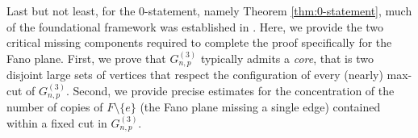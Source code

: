\documentclass[11pt,a4paper,oneside,reqno]{amsart}
\newcommand{\Gnp}{G_{n, p}^{(3)}}
\newcommand{\1}{\mathbbm{1}} %
\begin{document}
Last but not least, for the 0-statement, namely Theorem \ref{thm:0-statement}, much of the foundational framework was established in \cite{hoshen2024stabilitylargecutsrandom}. Here, we provide the two critical missing components required to complete the proof specifically for the Fano plane. First, we prove that $\Gnp$ typically admits a \textit{core}, that is two disjoint large sets of vertices that respect the configuration of every (nearly) max-cut of $\Gnp$. Second, we provide precise estimates for the concentration of the number of copies of $F \setminus \{e\}$ (the Fano plane missing a single edge) contained within a fixed cut in $\Gnp$.



\end{document}
